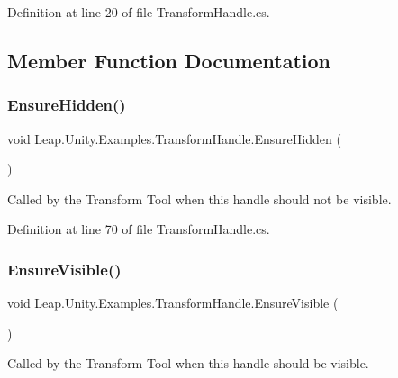Definition at line 20 of file Transform\+Handle.\+cs.



\subsection{Member Function Documentation}
\mbox{\label{class_leap_1_1_unity_1_1_examples_1_1_transform_handle_a0b4f4c6eacf1086b9903ced1eed8a6ce}} 
\subsubsection{\texorpdfstring{EnsureHidden()}{EnsureHidden()}}
{\footnotesize\ttfamily void Leap.\+Unity.\+Examples.\+Transform\+Handle.\+Ensure\+Hidden (\begin{DoxyParamCaption}{ }\end{DoxyParamCaption})}



Called by the Transform Tool when this handle should not be visible. 



Definition at line 70 of file Transform\+Handle.\+cs.

\mbox{\label{class_leap_1_1_unity_1_1_examples_1_1_transform_handle_a7a05bc45924b44e7700a1388a7ff1eaf}} 
\subsubsection{\texorpdfstring{EnsureVisible()}{EnsureVisible()}}
{\footnotesize\ttfamily void Leap.\+Unity.\+Examples.\+Transform\+Handle.\+Ensure\+Visible (\begin{DoxyParamCaption}{ }\end{DoxyParamCaption})}



Called by the Transform Tool when this handle should be visible. 



